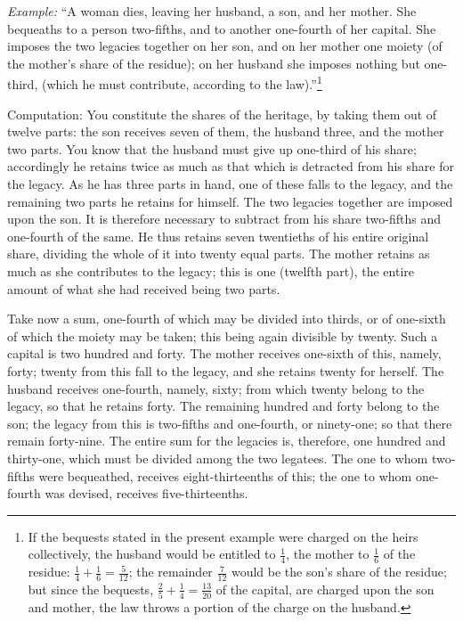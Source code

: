 \textit{Example:} ``A woman dies, leaving her husband, a son, and her mother. She bequeaths to a person two-fifths, and to another one-fourth of her capital. She imposes the two legacies together on her son, and on her mother one moiety (of the mother's share of the residue); on her husband she imposes nothing but one-third, (which he must contribute, according to the law).''\footnote{If the bequests stated in the present example were charged on the heirs collectively, the husband would be entitled to $\frac{1}{4}$, the mother to $\frac{1}{6}$ of the residue: $\frac{1}{4} + \frac{1}{6} = \frac{5}{12}$; the remainder $\frac{7}{12}$ would be the son's share of the residue; but since the bequests, $\frac{2}{5} + \frac{1}{4} = \frac{13}{20}$ of the capital, are charged upon the son and mother, the law throws a portion of the charge on the husband.}

Computation: You constitute the shares of the heritage, by taking them out of twelve parts: the son receives seven of them, the husband three, and the mother two parts. You know that the husband must give up one-third of his share; accordingly he retains twice as much as that which is detracted from his share for the legacy. As he has three parts in hand, one of these falls to the legacy, and the remaining two parts he retains for himself. The two legacies together are imposed upon the son. It is therefore necessary to subtract from his share two-fifths and one-fourth of the same. He thus retains seven twentieths of his entire original share, dividing the whole of it into twenty equal parts. The mother retains as much as she contributes to the legacy; this is one (twelfth part), the entire amount of what she had received being two parts.

Take now a sum, one-fourth of which may be divided into thirds, or of one-sixth of which the moiety may be taken; this being again divisible by twenty. Such a capital is two hundred and forty. The mother receives one-sixth of this, namely, forty; twenty from this fall to the legacy, and she retains twenty for herself. The husband receives one-fourth, namely, sixty; from which twenty belong to the legacy, so that he retains forty. The remaining hundred and forty belong to the son; the legacy from this is two-fifths and one-fourth, or ninety-one; so that there remain forty-nine. The entire sum for the legacies is, therefore, one hundred and thirty-one, which must be divided among the two legatees. The one to whom two-fifths were bequeathed, receives eight-thirteenths of this; the one to whom one-fourth was devised, receives five-thirteenths.

